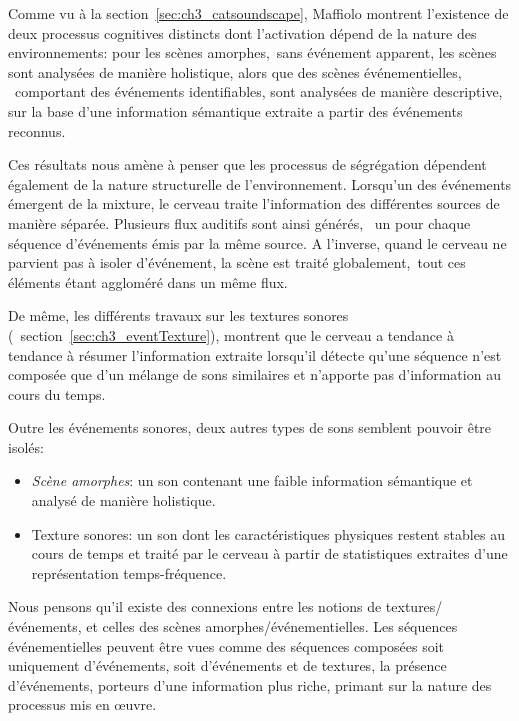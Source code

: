 Comme vu à la section~\ref{sec:ch3_catsoundscape}, Maffiolo montrent l'existence de deux processus cognitives distincts dont l'activation dépend de la nature des environnements: pour les scènes amorphes,\ie~sans événement apparent, les scènes sont analysées de manière holistique, alors que des scènes événementielles, \ie~comportant des événements identifiables, sont analysées de manière descriptive, sur la base d'une information sémantique extraite a partir des événements reconnus.

Ces résultats nous amène à penser que les processus de ségrégation dépendent également de la nature structurelle de l'environnement. Lorsqu'un des événements émergent de la mixture, le cerveau traite l'information des différentes sources de manière séparée. Plusieurs flux auditifs sont ainsi générés, \ie~un pour chaque séquence d'événements émis par la même source. A l'inverse, quand le cerveau ne parvient pas à isoler d'événement, la scène est traité globalement,\ie~tout ces éléments étant aggloméré dans un même flux. 

De même, les différents travaux sur les textures sonores (\cf~section~\ref{sec:ch3_eventTexture}), montrent que le cerveau a tendance à tendance à résumer l'information extraite lorsqu'il détecte qu'une séquence n'est  composée que d'un mélange de sons similaires et n'apporte pas d'information au cours du temps. 

Outre les événements sonores, deux autres types de sons semblent pouvoir être isolés:

\begin{itemize}
\item \emph{Scène amorphes}: un son contenant une faible information sémantique et analysé de manière holistique.
\item {Texture sonores}: un son dont les caractéristiques physiques restent stables au cours de temps et traité par le cerveau à partir de statistiques extraites d'une représentation temps-fréquence.
\end{itemize}

Nous pensons qu'il existe des connexions entre les notions de textures/événements, et celles des scènes amorphes/événementielles. Les séquences événementielles peuvent être vues comme des séquences composées soit uniquement d'événements, soit d'événements et de textures, la présence d'événements, porteurs d'une information plus riche, primant sur la nature des processus mis en œuvre. 

